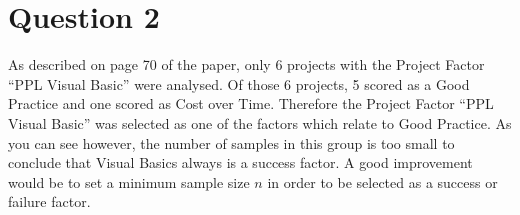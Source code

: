 \section{Question 2}

As described on page 70 of the paper, only 6 projects with the Project Factor ``PPL Visual Basic'' were analysed. Of those 6 projects, 5 scored as a Good Practice and one scored as Cost over Time. Therefore the Project Factor ``PPL Visual Basic'' was selected as one of the factors which relate to Good Practice. As you can see however, the number of samples in this group is too small to conclude that Visual Basics always is a success factor. A good improvement would be to set a minimum sample size $n$ in order to be selected as a success or failure factor.  
